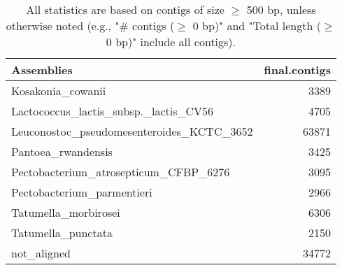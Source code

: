 \documentclass[12pt,a4paper]{article}
\begin{document}
\begin{table}[ht]
\begin{center}
\caption{All statistics are based on contigs of size $\geq$ 500 bp, unless otherwise noted (e.g., "\# contigs ($\geq$ 0 bp)" and "Total length ($\geq$ 0 bp)" include all contigs).}
\begin{tabular}{|l*{1}{|r}|}
\hline
Assemblies & final.contigs \\ \hline
Kosakonia\_cowanii & 3389 \\ \hline
Lactococcus\_lactis\_subsp.\_lactis\_CV56 & 4705 \\ \hline
Leuconostoc\_pseudomesenteroides\_KCTC\_3652 & 63871 \\ \hline
Pantoea\_rwandensis & 3425 \\ \hline
Pectobacterium\_atrosepticum\_CFBP\_6276 & 3095 \\ \hline
Pectobacterium\_parmentieri & 2966 \\ \hline
Tatumella\_morbirosei & 6306 \\ \hline
Tatumella\_punctata & 2150 \\ \hline
not\_aligned & 34772 \\ \hline
\end{tabular}
\end{center}
\end{table}
\end{document}
